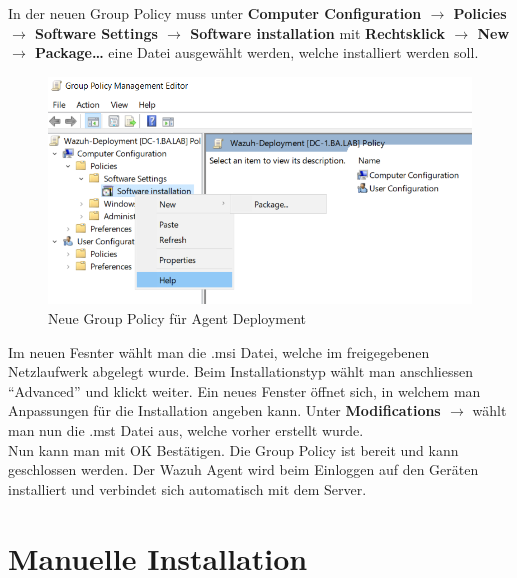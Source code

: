 In der neuen Group Policy muss unter \textbf{Computer Configuration $\rightarrow$ Policies $\rightarrow$ Software Settings $\rightarrow$ Software installation} mit \textbf{Rechtsklick $\rightarrow$ New $\rightarrow$ Package\dots} eine Datei ausgewählt werden, welche installiert werden soll.

\begin{figure}[H]
    \centering
    \includegraphics[width=\linewidth]{../img/agent/new-software-install.png}
    \caption{Neue Group Policy für Agent Deployment}
\end{figure}
Im neuen Fesnter wählt man die .msi Datei, welche im freigegebenen Netzlaufwerk abgelegt wurde.
Beim Installationstyp wählt man anschliessen ``Advanced'' und klickt weiter.
Ein neues Fenster öffnet sich, in welchem man Anpassungen für die Installation angeben kann.
Unter \textbf{Modifications $\rightarrow$} wählt man nun die .mst Datei aus, welche vorher erstellt wurde.\\

Nun kann man mit OK Bestätigen.
Die Group Policy ist bereit und kann geschlossen werden.
Der Wazuh Agent wird beim Einloggen auf den Geräten installiert und verbindet sich automatisch mit dem Server.


\section{Manuelle Installation}

